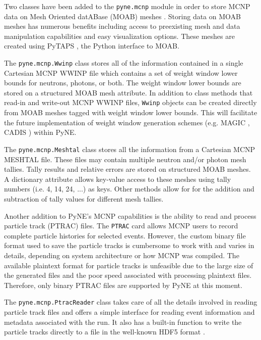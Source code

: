 \documentclass{ansconf}
\begin{document}
Two classes have been added to the \texttt{pyne.mcnp} module in order to store
MCNP data on Mesh Oriented datABase (MOAB) meshes \cite{tautges_moab:_2004}.
Storing data on MOAB meshes has numerous benefits including access to preexisting
mesh and data manipulation capabilities and easy visualization options. These
meshes are created using PyTAPS \cite{pytaps}, the Python interface to MOAB.

The \texttt{pyne.mcnp.Wwinp} class stores all of the information contained in a
single Cartesian MCNP WWINP file which contains a set of weight window lower
bounds for neutrons, photons, or both. The weight window lower bounds are
stored on a structured MOAB mesh attribute. In addition to class methods that
read-in and write-out MCNP WWINP files, \texttt{Wwinp} objects can be created
directly from MOAB meshes tagged with weight window lower bounds. This will
facilitate the future implementation of weight window generation schemes (e.g.
MAGIC \cite{davis_comparison_2011}, CADIS \cite{haghighat_monte_2003}) within
PyNE.

The \texttt{pyne.mcnp.Meshtal} class stores all the information from a Cartesian
MCNP MESHTAL file. These files may contain multiple neutron and/or photon mesh
tallies.  Tally results and relative errors are stored on structured MOAB
meshes. A dictionary attribute allows key-value access to these meshes using
tally numbers (i.e. 4, 14, 24, ...) as keys. Other methods allow for for the
addition and subtraction of tally values for different mesh tallies.

Another addition to PyNE's MCNP capabilities is the ability to read and
process particle track (PTRAC) files. The \texttt{PTRAC} card allows MCNP
users to record complete particle histories for selected events. However,
the custom binary file format used to save the particle tracks is cumbersome
to work with and varies in details, depending on system architecture or
how MCNP was compiled. The available plaintext format for particle
tracks is unfeasible due to the large size of the generated files and the
poor speed associated with processing plaintext files. Therefore, only
binary PTRAC files are supported by PyNE at this moment.

The \texttt{pyne.mcnp.PtracReader} class takes care of all the details
involved in reading particle track files and offers a simple interface
for reading event information and metadata associated with the run.
It also has a built-in function to write the particle tracks directly
to a file in the well-known HDF5 format \cite{hdf5}.



\end{document}
